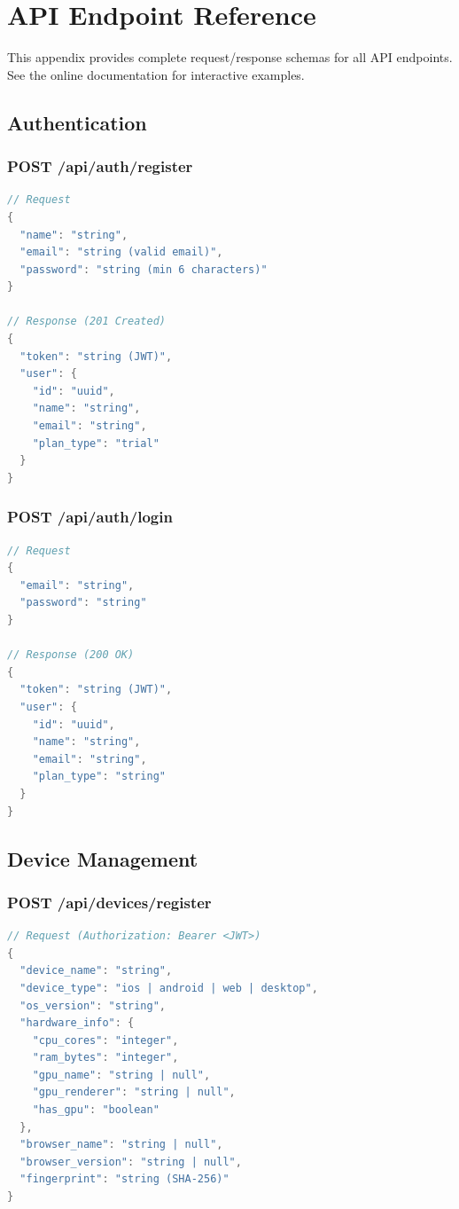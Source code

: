 \documentclass[12pt, letterpaper, twoside]{report}
\begin{document}
\chapter{API Endpoint Reference}
\label{app:api}

This appendix provides complete request/response schemas for all API endpoints. See the online documentation for interactive examples.

\section{Authentication}

\subsection{POST /api/auth/register}
\begin{lstlisting}[language=Java, caption={Registration request and response}]
// Request
{
  "name": "string",
  "email": "string (valid email)",
  "password": "string (min 6 characters)"
}

// Response (201 Created)
{
  "token": "string (JWT)",
  "user": {
    "id": "uuid",
    "name": "string",
    "email": "string",
    "plan_type": "trial"
  }
}
\end{lstlisting}

\subsection{POST /api/auth/login}
\begin{lstlisting}[language=Java, caption={Login request and response}]
// Request
{
  "email": "string",
  "password": "string"
}

// Response (200 OK)
{
  "token": "string (JWT)",
  "user": {
    "id": "uuid",
    "name": "string",
    "email": "string",
    "plan_type": "string"
  }
}
\end{lstlisting}

\section{Device Management}

\subsection{POST /api/devices/register}
\begin{lstlisting}[language=Java, caption={Device registration request}]
// Request (Authorization: Bearer <JWT>)
{
  "device_name": "string",
  "device_type": "ios | android | web | desktop",
  "os_version": "string",
  "hardware_info": {
    "cpu_cores": "integer",
    "ram_bytes": "integer",
    "gpu_name": "string | null",
    "gpu_renderer": "string | null",
    "has_gpu": "boolean"
  },
  "browser_name": "string | null",
  "browser_version": "string | null",
  "fingerprint": "string (SHA-256)"
}
\end{lstlisting}
\end{document}
